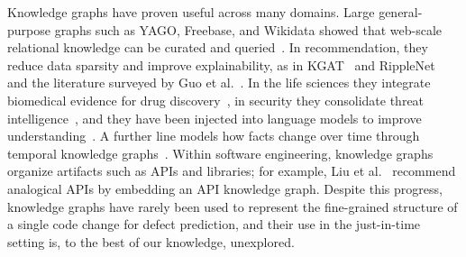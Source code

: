 \documentclass[final,5p,times,twocolumn]{elsarticle}
\theoremstyle{plain}
\begin{document}
Knowledge graphs have proven useful across many domains. Large general-purpose graphs such as YAGO, Freebase, and Wikidata showed that web-scale relational knowledge can be curated and queried~\cite{suchanek2007yago,bollacker2008freebase,vrandecic2014wikidata}. In recommendation, they reduce data sparsity and improve explainability, as in KGAT~\cite{wang2019kgat} and RippleNet~\cite{wang2018ripplenet} and the literature surveyed by Guo et al.~\cite{guo2022survey}. In the life sciences they integrate biomedical evidence for drug discovery~\cite{maclean2021knowledge}, in security they consolidate threat intelligence~\cite{zhao2024survey}, and they have been injected into language models to improve understanding~\cite{zhang2019ernie}. A further line models how facts change over time through temporal knowledge graphs~\cite{zhang2024survey,cai2024survey,trivedi2017knowevolve,goel2020diachronic,jin2020renet,lacroix2020tensor}. Within software engineering, knowledge graphs organize artifacts such as APIs and libraries; for example, Liu et al.~\cite{liu2023recommending} recommend analogical APIs by embedding an API knowledge graph. Despite this progress, knowledge graphs have rarely been used to represent the fine-grained structure of a single code change for defect prediction, and their use in the just-in-time setting is, to the best of our knowledge, unexplored.

\end{document}

